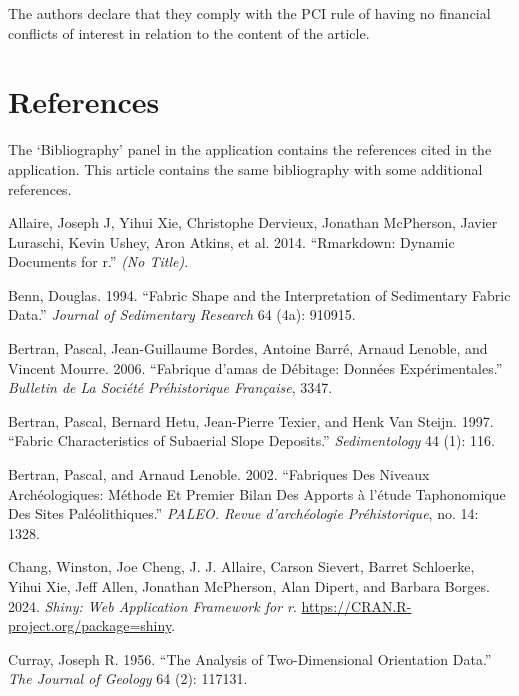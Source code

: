 \documentclass[
]{article}
\newlength{\cslhangindent}
\newenvironment{CSLReferences}[2] %
 {\begin{list}{}{%
  \setlength{\itemindent}{0pt}
  \setlength{\leftmargin}{0pt}
  \setlength{\parsep}{0pt}
  \ifodd #1
   \setlength{\leftmargin}{\cslhangindent}
   \setlength{\itemindent}{-1\cslhangindent}
  \fi
  \setlength{\itemsep}{#2\baselineskip}}}
 {\end{list}}
\begin{document}
The authors declare that they comply with the PCI rule of having no
financial conflicts of interest in relation to the content of the
article. \bigbreak

\section{References}\label{references}

The `Bibliography' panel in the application contains the references
cited in the application. This article contains the same bibliography
with some additional references. \bigbreak

\label{refs}
\begin{CSLReferences}{1}{0}
Allaire, Joseph J, Yihui Xie, Christophe Dervieux, Jonathan McPherson,
Javier Luraschi, Kevin Ushey, Aron Atkins, et al. 2014. {``Rmarkdown:
Dynamic Documents for r.''} \emph{(No Title)}.

Benn, Douglas. 1994. {``Fabric Shape and the Interpretation of
Sedimentary Fabric Data.''} \emph{Journal of Sedimentary Research} 64
(4a): 910915.

Bertran, Pascal, Jean-Guillaume Bordes, Antoine Barré, Arnaud Lenoble,
and Vincent Mourre. 2006. {``Fabrique d'amas de Débitage: Données
Expérimentales.''} \emph{Bulletin de La Société Préhistorique
Française}, 3347.

Bertran, Pascal, Bernard Hetu, Jean-Pierre Texier, and Henk Van Steijn.
1997. {``Fabric Characteristics of Subaerial Slope Deposits.''}
\emph{Sedimentology} 44 (1): 116.

Bertran, Pascal, and Arnaud Lenoble. 2002. {``Fabriques Des Niveaux
Archéologiques: Méthode Et Premier Bilan Des Apports à l{'}étude
Taphonomique Des Sites Paléolithiques.''} \emph{PALEO. Revue
d'archéologie Préhistorique}, no. 14: 1328.

Chang, Winston, Joe Cheng, J. J. Allaire, Carson Sievert, Barret
Schloerke, Yihui Xie, Jeff Allen, Jonathan McPherson, Alan Dipert, and
Barbara Borges. 2024. \emph{Shiny: Web Application Framework for r}.
\url{https://CRAN.R-project.org/package=shiny}.

Curray, Joseph R. 1956. {``The Analysis of Two-Dimensional Orientation
Data.''} \emph{The Journal of Geology} 64 (2): 117131.


\end{CSLReferences}
\end{document}
